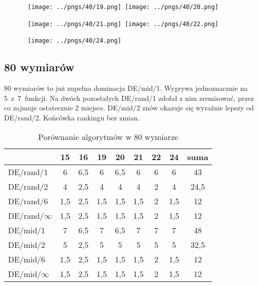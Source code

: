 \begin{figure}[H]
\centering
\mbox{
\texttt{[image: ../pngs/40/19.png]} \quad
\texttt{[image: ../pngs/40/20.png]} 
}
\end{figure}

\begin{figure}[H]
\centering
\mbox{
\texttt{[image: ../pngs/40/21.png]} \quad
\texttt{[image: ../pngs/40/22.png]} 
}
\end{figure}

\begin{figure}[H]
\centering
\mbox{
\texttt{[image: ../pngs/40/24.png]} \quad
}
\end{figure}

\subsection{80 wymiarów}

80 wymiarów to już zupełna dominacja DE/mid/1. Wygrywa jednoznacznie na 5~z~7~funkcji.
Na dwóch pozostałych DE/rand/1 zdołał z nim zremisować, przez co zajmuje ostatecznie 2 miejsce.
DE/mid/2 znów okazuje się wyraźnie lepszy od DE/rand/2. Końcówka rankingu bez zmian.

\begin{table}[H]
\centering
\begin{tabular}{ l | c | c | c | c | c | c | c | c}
                 & 15  & 16  & 19  & 20  & 21  & 22  & 24  & suma \\ \hline
DE/rand/1        & 6   & 6,5 & 6   & 6,5 & 6   & 6   & 6   & 43   \\ 
DE/rand/2        & 4   & 2,5 & 4   & 4   & 4   & 2   & 4   & 24,5 \\ 
DE/rand/6        & 1,5 & 2,5 & 1,5 & 1,5 & 1,5 & 2   & 1,5 & 12   \\ 
DE/rand/$\infty$ & 1,5 & 2,5 & 1,5 & 1,5 & 1,5 & 2   & 1,5 & 12   \\ 
DE/mid/1         & 7   & 6,5 & 7   & 6,5 & 7   & 7   & 7   & 48   \\
DE/mid/2         & 5   & 2,5 & 5   & 5   & 5   & 5   & 5   & 32,5 \\
DE/mid/6         & 1,5 & 2,5 & 1,5 & 1,5 & 1,5 & 2   & 1,5 & 12   \\ 
DE/mid/$\infty$  & 1,5 & 2,5 & 1,5 & 1,5 & 1,5 & 2   & 1,5 & 12   \\
\end{tabular}
\caption{Porównanie algorytmów w 80 wymiarze}
\label{table:80d}
\end{table}

